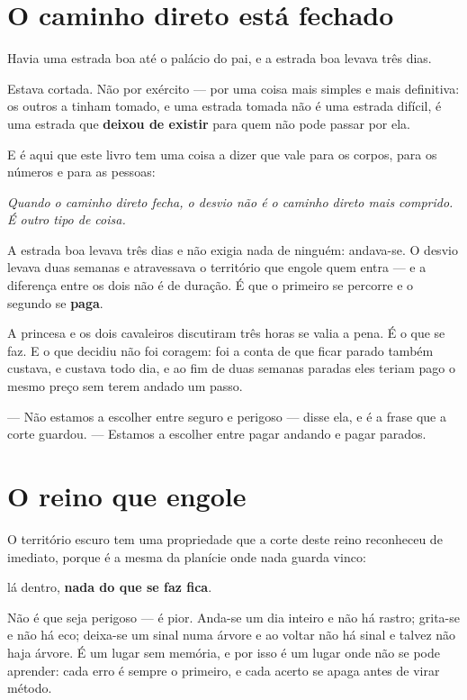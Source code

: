 \documentclass[livro.tex]{subfiles}
\begin{document}
\section{O caminho direto está fechado}

Havia uma estrada boa até o palácio do pai, e a estrada boa levava três dias.

Estava cortada. Não por exército --- por uma coisa mais simples e mais definitiva: os
outros a tinham tomado, e uma estrada tomada não é uma estrada difícil, é uma estrada que
\textbf{deixou de existir} para quem não pode passar por ela.

E é aqui que este livro tem uma coisa a dizer que vale para os corpos, para os números e
para as pessoas:

\medskip

\emph{Quando o caminho direto fecha, o desvio não é o caminho direto mais comprido. É
outro tipo de coisa.}

A estrada boa levava três dias e não exigia nada de ninguém: andava-se. O desvio levava
duas semanas e atravessava o território que engole quem entra --- e a diferença entre os
dois não é de duração. É que o primeiro se percorre e o segundo se \textbf{paga}.

A princesa e os dois cavaleiros discutiram três horas se valia a pena. É o que se faz. E o
que decidiu não foi coragem: foi a conta de que ficar parado também custava, e custava
todo dia, e ao fim de duas semanas paradas eles teriam pago o mesmo preço sem terem andado
um passo.

--- Não estamos a escolher entre seguro e perigoso --- disse ela, e é a frase que a corte
guardou. --- Estamos a escolher entre pagar andando e pagar parados.

\section{O reino que engole}

O território escuro tem uma propriedade que a corte deste reino reconheceu de imediato,
porque é a mesma da planície onde nada guarda vinco:

lá dentro, \textbf{nada do que se faz fica}.

Não é que seja perigoso --- é pior. Anda-se um dia inteiro e não há rastro; grita-se e não
há eco; deixa-se um sinal numa árvore e ao voltar não há sinal e talvez não haja árvore. É
um lugar sem memória, e por isso é um lugar onde não se pode aprender: cada erro é sempre
o primeiro, e cada acerto se apaga antes de virar método.
\end{document}
